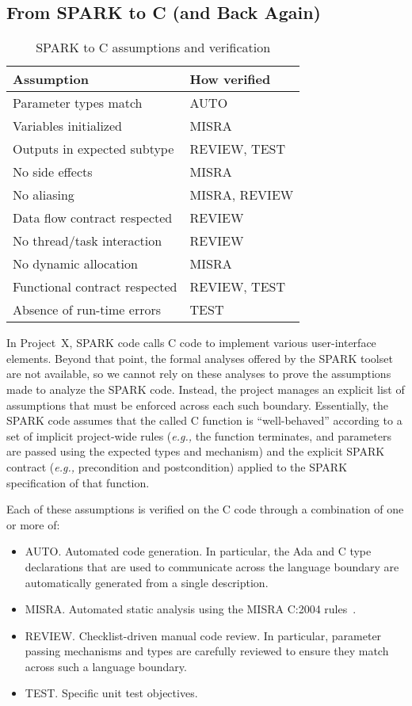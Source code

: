 \documentclass{llncs}
\newcommand{\spark}{SPARK\xspace}
\newcommand{\projectx}{Project~X\xspace}
\newcommand{\eg}{\textit{e.g.,}\xspace}
\begin{document}
\subsection{From \spark to C (and Back Again)}

\begin{table}[t]
\begin{center}
\begin{tabular}{l|l}
Assumption & How verified\\
\hline
Parameter types match & AUTO\\
Variables initialized & MISRA\\
Outputs in expected subtype & REVIEW, TEST\\
No side effects & MISRA\\
No aliasing & MISRA, REVIEW\\
Data flow contract respected & REVIEW\\
No thread/task interaction & REVIEW\\
No dynamic allocation & MISRA\\
Functional contract respected & REVIEW, TEST\\
Absence of run-time errors & TEST\\
\end{tabular}
\end{center}
\caption{\spark to C assumptions and verification}
\label{sparkctable}
\end{table}

In \projectx, \spark code calls C code to implement various user-interface
elements. Beyond that point, the formal analyses offered by the \spark
toolset are not available, so we cannot rely on these analyses to prove
the assumptions made to analyze the \spark code.
Instead, the project manages an explicit list
of assumptions that must be enforced across each such boundary.
Essentially, the \spark code assumes that the called C function
is ``well-behaved'' according to a set of implicit project-wide rules
(\eg the function terminates, and parameters are passed using the
expected types and mechanism) and the explicit \spark contract
(\eg precondition and postcondition) applied to the \spark specification
of that function.

Each of these assumptions is verified on the C code through
a combination of one or more of:

\begin{itemize}
   \item AUTO. Automated code generation. In particular, the Ada and C
type declarations that are used to communicate across the language
boundary are automatically generated from a single description.
   \item MISRA. Automated static analysis using the MISRA C:2004 rules~\cite{misrac}.
   \item REVIEW. Checklist-driven manual code review. In particular, parameter
passing mechanisms and types are carefully reviewed to ensure they match
across such a language boundary.
   \item TEST. Specific unit test objectives.
\end{itemize}
\end{document}
